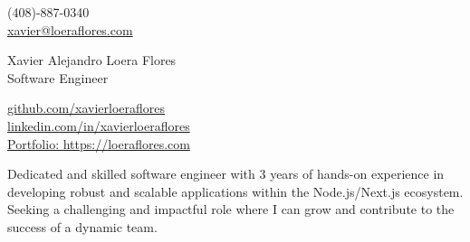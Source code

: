 \documentclass[a4,10pt]{article}
\begin{document}
\begin{center}
    \begin{minipage}[b]{0.29\textwidth}
            (408)-887-0340 \\
            \href{mailto:xavier@loeraflores.com}{xavier@loeraflores.com} 
    \end{minipage}%
    \begin{minipage}[b]{0.4\textwidth}
            \centering
            {\Large Xavier Alejandro Loera Flores} \\ %
            \vspace{0.1cm}
            {\color{UI_blue} \Large{Software Engineer}} \\
    \end{minipage}%
    \begin{minipage}[b]{0.29\textwidth}
            \flushright  %
            {\href{https://github.com/xavierloeraflores}{github.com/xavierloeraflores} } \\
            {\href{https://www.linkedin.com/in/xavierloeraflores}{linkedin.com/in/xavierloeraflores} } \\
            {\href{https://loeraflores.com}{Portfolio: https://loeraflores.com}}
    \end{minipage}   
    
\vspace{-0.15cm} 
{\color{UI_blue} \hrulefill}
\end{center}
\vspace{-0.25cm}

{Dedicated and skilled software engineer with 3 years of hands-on experience in developing robust and scalable applications within the Node.js/Next.js ecosystem. Seeking a challenging and impactful role where I can grow and contribute to the success of a dynamic team.}
\vspace{-0.4cm}

\end{document}
